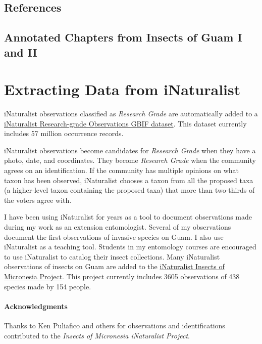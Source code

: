 \documentclass[12pt,letterpaper,english,bibliography=totocnumbered, abstract=on]{scrartcl}
\begin{document}
\subsection{References}
\printbibliography[heading=none]


\subsection{Annotated Chapters from Insects of Guam I and II}
\newrefsection[blr]
\nocite{*}
\printbibliography[heading=none]



\pagebreak
\section{Extracting Data from iNaturalist}

iNaturalist observations classified as \textit{Research Grade} are automatically added to a \href{https://www.gbif.org/dataset/50c9509d-22c7-4a22-a47d-8c48425ef4a7}{iNaturalist Research-grade Observations GBIF dataset}. This dataset currently includes 57 million occurrence records. 

iNaturalist observations become candidates for \textit{Research Grade} when they have a photo, date, and coordinates. They become \textit{Research Grade} when the community agrees on an identification. If the community has multiple opinions on what taxon has been observed, iNaturalist chooses a taxon from all the proposed taxa (a higher-level taxon containing the proposed taxa) that more than two-thirds of the voters agree with.

I have been using iNaturalist for years as a tool to document observations made during my work as an extension entomologist. Several of my observations document the first observations of invasive species on Guam. I also use iNaturalist as a teaching tool. Students in my entomology courses are encouraged to use iNaturalist to catalog their insect collections. Many iNaturalist observations of insects on Guam are added to the \href{https://www.inaturalist.org/projects/insects-of-micronesia}{iNaturalist Insects of Micronesia Project}. This project currently includes 3605 observations of 438 species made by 154 people. 

\paragraph{Acknowledgments} Thanks to Ken Puliafico and others for observations and identifications contributed to the \textit{Insects of Micronesia iNaturalist Project}.
\end{document}
